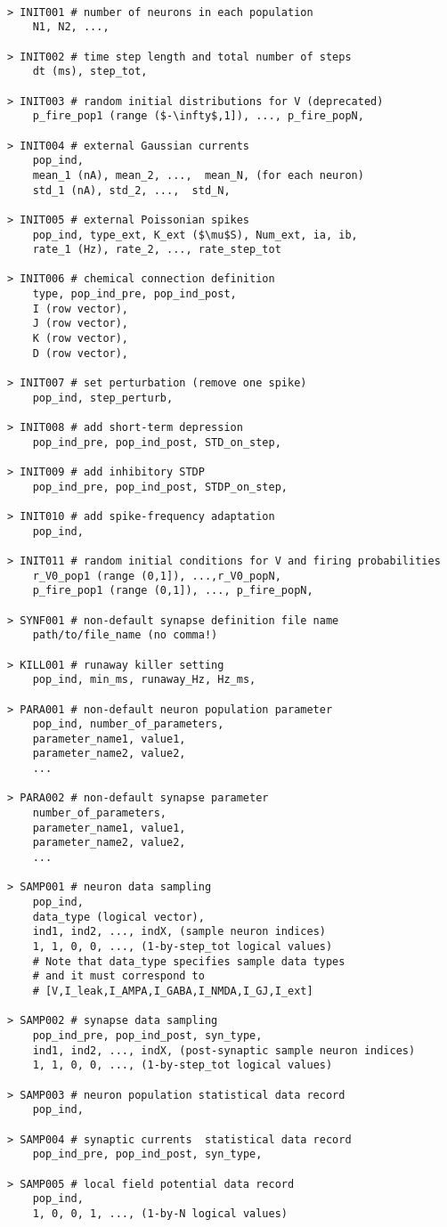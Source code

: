 \documentclass{article}
\begin{document}

\begin{lstlisting}[mathescape]

> INIT001 # number of neurons in each population
	N1, N2, ...,

> INIT002 # time step length and total number of steps
	dt (ms), step_tot,

> INIT003 # random initial distributions for V (deprecated)
	p_fire_pop1 (range ($-\infty$,1]), ..., p_fire_popN, 

> INIT004 # external Gaussian currents
	pop_ind, 
	mean_1 (nA), mean_2, ...,  mean_N, (for each neuron)
	std_1 (nA), std_2, ...,  std_N, 

> INIT005 # external Poissonian spikes
	pop_ind, type_ext, K_ext ($\mu$S), Num_ext, ia, ib,
	rate_1 (Hz), rate_2, ..., rate_step_tot

> INIT006 # chemical connection definition
	type, pop_ind_pre, pop_ind_post,
	I (row vector),
	J (row vector),
	K (row vector),
	D (row vector),

> INIT007 # set perturbation (remove one spike)
	pop_ind, step_perturb,

> INIT008 # add short-term depression
	pop_ind_pre, pop_ind_post, STD_on_step,

> INIT009 # add inhibitory STDP
	pop_ind_pre, pop_ind_post, STDP_on_step,
	
> INIT010 # add spike-frequency adaptation 
	pop_ind,

> INIT011 # random initial conditions for V and firing probabilities
	r_V0_pop1 (range (0,1]), ...,r_V0_popN, 
	p_fire_pop1 (range (0,1]), ..., p_fire_popN, 
	
> SYNF001 # non-default synapse definition file name
	path/to/file_name (no comma!)

> KILL001 # runaway killer setting
	pop_ind, min_ms, runaway_Hz, Hz_ms,

> PARA001 # non-default neuron population parameter
	pop_ind, number_of_parameters,
	parameter_name1, value1,
	parameter_name2, value2,
	...
 
> PARA002 # non-default synapse parameter
	number_of_parameters,
	parameter_name1, value1,
	parameter_name2, value2,
	...

> SAMP001 # neuron data sampling 
	pop_ind,
	data_type (logical vector),
	ind1, ind2, ..., indX, (sample neuron indices)
	1, 1, 0, 0, ..., (1-by-step_tot logical values)
	# Note that data_type specifies sample data types
	# and it must correspond to 
	# [V,I_leak,I_AMPA,I_GABA,I_NMDA,I_GJ,I_ext]

> SAMP002 # synapse data sampling 
	pop_ind_pre, pop_ind_post, syn_type,
	ind1, ind2, ..., indX, (post-synaptic sample neuron indices)
	1, 1, 0, 0, ..., (1-by-step_tot logical values)
	
> SAMP003 # neuron population statistical data record
	pop_ind,
	
> SAMP004 # synaptic currents  statistical data record
	pop_ind_pre, pop_ind_post, syn_type,

> SAMP005 # local field potential data record
	pop_ind,
	1, 0, 0, 1, ..., (1-by-N logical values)
	
\end{lstlisting}
\end{document}
